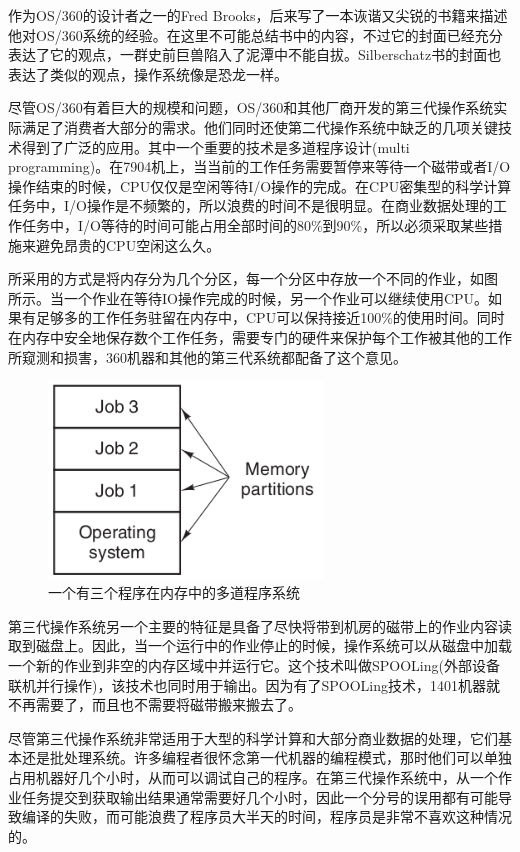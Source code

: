 	作为OS/360的设计者之一的Fred Brooks，后来写了一本诙谐又尖锐的书籍来描述他对OS/360系统的经验。在这里不可能总结书中的内容，不过它的封面已经充分表达了它的观点，一群史前巨兽陷入了泥潭中不能自拔。Silberschatz书的封面也表达了类似的观点，操作系统像是恐龙一样。
	
	尽管OS/360有着巨大的规模和问题，OS/360和其他厂商开发的第三代操作系统实际满足了消费者大部分的需求。他们同时还使第二代操作系统中缺乏的几项关键技术得到了广泛的应用。其中一个重要的技术是多道程序设计(multi programming)。在7904机上，当当前的工作任务需要暂停来等待一个磁带或者I/O操作结束的时候，CPU仅仅是空闲等待I/O操作的完成。在CPU密集型的科学计算任务中，I/O操作是不频繁的，所以浪费的时间不是很明显。在商业数据处理的工作任务中，I/O等待的时间可能占用全部时间的80\%到90\%，所以必须采取某些措施来避免昂贵的CPU空闲这么久。
	
	所采用的方式是将内存分为几个分区，每一个分区中存放一个不同的作业，如图 所示。当一个作业在等待IO操作完成的时候，另一个作业可以继续使用CPU。如果有足够多的工作任务驻留在内存中，CPU可以保持接近100\%的使用时间。同时在内存中安全地保存数个工作任务，需要专门的硬件来保护每个工作被其他的工作所窥测和损害，360机器和其他的第三代系统都配备了这个意见。
	
	\begin{figure}[ht]\small
		\centering
		\includegraphics[width=0.65\textwidth]{FIG/1-5.png}
		\caption{一个有三个程序在内存中的多道程序系统}\label{fig:multiprogramming}
	\end{figure}

	第三代操作系统另一个主要的特征是具备了尽快将带到机房的磁带上的作业内容读取到磁盘上。因此，当一个运行中的作业停止的时候，操作系统可以从磁盘中加载一个新的作业到非空的内存区域中并运行它。这个技术叫做SPOOLing(外部设备联机并行操作)，该技术也同时用于输出。因为有了SPOOLing技术，1401机器就不再需要了，而且也不需要将磁带搬来搬去了。
	
	尽管第三代操作系统非常适用于大型的科学计算和大部分商业数据的处理，它们基本还是批处理系统。许多编程者很怀念第一代机器的编程模式，那时他们可以单独占用机器好几个小时，从而可以调试自己的程序。在第三代操作系统中，从一个作业任务提交到获取输出结果通常需要好几个小时，因此一个分号的误用都有可能导致编译的失败，而可能浪费了程序员大半天的时间，程序员是非常不喜欢这种情况的。
	
